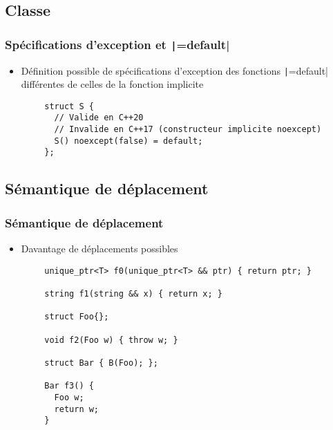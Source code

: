 \documentclass[C++.tex]{subfiles}
\begin{document}
\subsection*{Classe}
\begin{frame}[fragile]
	\frametitle{Spécifications d'exception et \texttt|=default|}
	\begin{itemize}
		\item Définition possible de spécifications d'exception des fonctions \texttt|=default| différentes de celles de la fonction implicite
	\end{itemize}

	\begin{verbatim}
		struct S {
		  // Valide en C++20
		  // Invalide en C++17 (constructeur implicite noexcept)
		  S() noexcept(false) = default;
		};
	\end{verbatim}
\end{frame}

\subsection*{Sémantique de déplacement}
\begin{frame}[fragile]
	\frametitle{Sémantique de déplacement}
	\begin{itemize}
		\item Davantage de déplacements possibles
	\end{itemize}

	\begin{verbatim}
		unique_ptr<T> f0(unique_ptr<T> && ptr) { return ptr; }

		string f1(string && x) { return x; }

		struct Foo{};

		void f2(Foo w) { throw w; }

		struct Bar { B(Foo); };

		Bar f3() {
		  Foo w;
		  return w;
		}
	\end{verbatim}

\end{frame}
\end{document}
